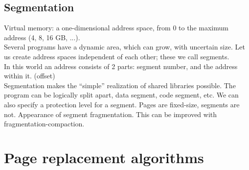 \documentclass[margin=0px]{article}
\begin{document}
\subsection{Segmentation}

Virtual memory: a one-dimensional address space, from 0 to the maximum address (4, 8, 16 GB, ...). \\
Several programs have a dynamic area, which can grow, with uncertain size. Let us create address spaces independent of each other; these we call segments. \\
In this world an address consists of 2 parts: segment number, and the address within it. (offset) \\
Segmentation makes the ``simple'' realization of shared libraries possible. The program can be logically split apart, data segment, code segment, etc. We can also specify a protection level for a segment. Pages are fixed-size, segments are not. Appearance of segment fragmentation. This can be improved with fragmentation-compaction.

\section{Page replacement algorithms}
\end{document}
